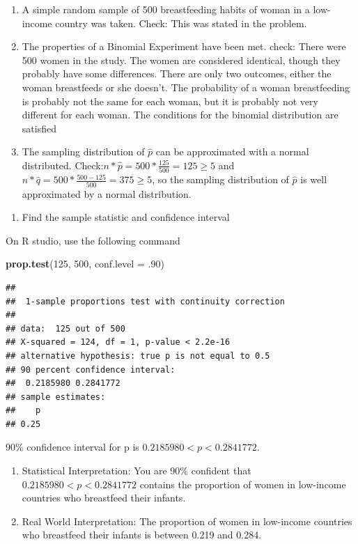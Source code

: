 \documentclass[
]{book}
\newenvironment{Shaded}{\begin{snugshade}}{\end{snugshade}}
\newcommand{\DataTypeTok}[1]{\textcolor[rgb]{0.13,0.29,0.53}{#1}}
\newcommand{\DecValTok}[1]{\textcolor[rgb]{0.00,0.00,0.81}{#1}}
\newcommand{\FloatTok}[1]{\textcolor[rgb]{0.00,0.00,0.81}{#1}}
\newcommand{\KeywordTok}[1]{\textcolor[rgb]{0.13,0.29,0.53}{\textbf{#1}}}
\newcommand{\NormalTok}[1]{#1}
\providecommand{\tightlist}{%
  \setlength{\itemsep}{0pt}\setlength{\parskip}{0pt}}
\begin{document}
\begin{enumerate}
\def\labelenumi{\alph{enumi}.}
\item
  A simple random sample of 500 breastfeeding habits of woman in a low-income country was taken. Check: This was stated in the problem.
\item
  The properties of a Binomial Experiment have been met. check: There were 500 women in the study. The women are considered identical, though they probably have some differences. There are only two outcomes, either the woman breastfeeds or she doesn't. The probability of a woman breastfeeding is probably not the same for each woman, but it is probably not very different for each woman. The conditions for the binomial distribution are satisfied
\item
  The sampling distribution of \(\hat{p}\) can be approximated with a normal distributed. Check:\(n*\hat{p}= 500*\frac{125}{500}=125\ge5\) and \(n*\hat{q}=500*\frac{500-125}{500}=375\ge5\), so the sampling distribution of \(\hat{p}\) is well approximated by a normal distribution.
\end{enumerate}

\begin{enumerate}
\def\labelenumi{\arabic{enumi}.}
\setcounter{enumi}{3}
\tightlist
\item
  Find the sample statistic and confidence interval
\end{enumerate}

On R studio, use the following command

\begin{Shaded}
\begin{Highlighting}[]
\KeywordTok{prop.test}\NormalTok{(}\DecValTok{125}\NormalTok{, }\DecValTok{500}\NormalTok{, }\DataTypeTok{conf.level =} \FloatTok{.90}\NormalTok{)}
\end{Highlighting}
\end{Shaded}

\begin{verbatim}
## 
##  1-sample proportions test with continuity correction
## 
## data:  125 out of 500
## X-squared = 124, df = 1, p-value < 2.2e-16
## alternative hypothesis: true p is not equal to 0.5
## 90 percent confidence interval:
##  0.2185980 0.2841772
## sample estimates:
##    p 
## 0.25
\end{verbatim}

90\% confidence interval for p is \(0.2185980<p<0.2841772\).

\begin{enumerate}
\def\labelenumi{\arabic{enumi}.}
\setcounter{enumi}{3}
\item
  Statistical Interpretation: You are 90\% confident that \(0.2185980<p<0.2841772\) contains the proportion of women in low-income countries who breastfeed their infants.
\item
  Real World Interpretation: The proportion of women in low-income countries who breastfeed their infants is between 0.219 and 0.284.
\end{enumerate}
\end{document}
